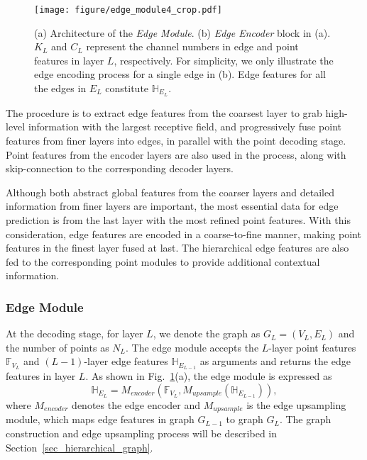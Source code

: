 \documentclass[10pt,twocolumn,letterpaper]{article}
\begin{document}
\begin{figure}[!t]
	\begin{center}
		\texttt{[image: figure/edge\_module4\_crop.pdf]}
	\end{center}
	\vspace{-2mm}
	\caption{(a) Architecture of the \textit{Edge Module}. (b) \textit{Edge Encoder} block in (a). $K_L$ and $C_L$ represent the channel numbers in edge and point features in layer $L$, respectively. For simplicity, we only illustrate the edge encoding process for a single edge in (b). Edge features for all the edges in $E_L$ constitute $\mathbb{H}_{E_L}$.}
	\label{fig_edge_module}
	\vspace{-4mm}
\end{figure}

The procedure is to extract edge features from the coarsest layer to grab high-level information with the largest receptive field, and progressively fuse point features from finer layers into edges, in parallel with the point decoding stage. Point features from the encoder layers are also used in the process, along with 
skip-connection to the corresponding decoder layers. 

Although both abstract global features from the coarser layers and detailed information from finer layers are important, the most essential data for edge prediction is from the last layer with the most refined point features. With this consideration, edge features are encoded in a coarse-to-fine manner, making point features in the finest layer fused at last. The hierarchical edge features are also fed to the corresponding point modules to provide additional contextual information.


\subsubsection{Edge Module}
\label{sec_edge_encoder}
At the decoding stage, 
for layer $L$, we denote the graph as $G_L = (V_L, E_L)$ and the number of points as $N_L$.
The edge module accepts the $L$-layer point features $\mathbb{F}_{V_L}$ and $(L-1)$-layer edge features  $\mathbb{H}_{E_{L-1}}$ as arguments and returns the edge features in layer $L$. As shown in Fig.~\ref{fig_edge_module}(a), the edge module is expressed as 
\begin{equation}
\mathbb{H}_{E_L} = M_{encoder}(\mathbb{F}_{V_L}, M_{upsample}(\mathbb{H}_{E_{L-1}})),
\end{equation}
where $M_{encoder}$ denotes the edge encoder and $M_{upsample}$ is the edge upsampling module, which maps edge features in graph $G_{L-1}$ to graph $G_{L}$. The graph construction and edge upsampling process will be described in Section~\ref{sec_hierarchical_graph}.
\end{document}
